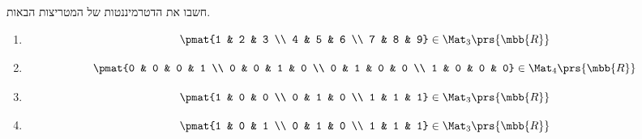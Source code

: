 \documentclass[a4paper,10pt,twoside,openany]{book}
\begin{document}
\begin{exercisechap}
חשבו את הדטרמיננטות של המטריצות הבאות.

\begin{enumerate}
\item \[\pmat{1 & 2 & 3 \\ 4 & 5 & 6 \\ 7 & 8 & 9} \in \Mat_{3}\prs{\mbb{R}}\]
\item \[\pmat{0 & 0 & 0 & 1 \\ 0 & 0 & 1 & 0 \\ 0 & 1 & 0 & 0 \\ 1 & 0 & 0 & 0} \in \Mat_{4}\prs{\mbb{R}}\]
\item \[\pmat{1 & 0 & 0 \\ 0 & 1 & 0 \\ 1 & 1 & 1} \in \Mat_{3}\prs{\mbb{R}}\]
\item \[\pmat{1 & 0 & 1 \\ 0 & 1 & 0 \\ 1 & 1 & 1} \in \Mat_{3}\prs{\mbb{R}}\]
\end{enumerate}
\end{exercisechap}
\end{document}
